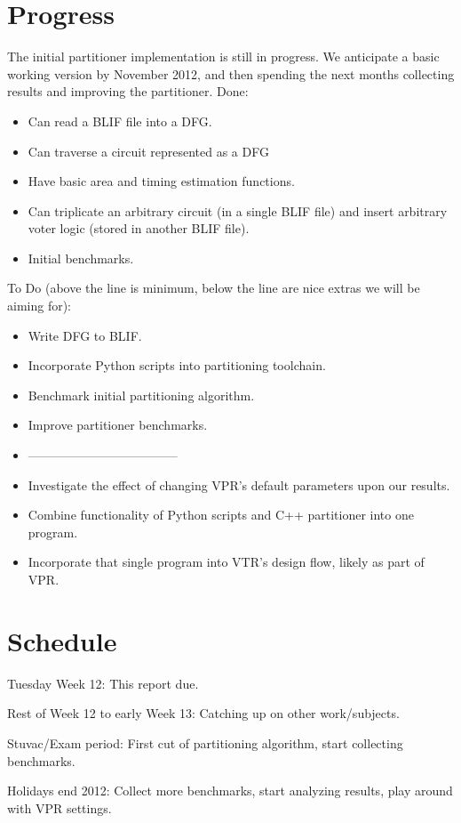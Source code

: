\documentclass[12pt,drafta4paper,oneside]{memoir} %
\begin{document}
\section{Progress}
The initial partitioner implementation is still in progress. We anticipate a basic working version by November 2012, and then spending the next months collecting results and improving the partitioner.
Done:
\begin{itemize}
    \item Can read a \ac{BLIF} file into a \ac{DFG}.
    \item Can traverse a circuit represented as a \ac{DFG}
    \item Have basic area and timing estimation functions.
    \item Can triplicate an arbitrary circuit (in a single \ac{BLIF} file) and insert arbitrary voter logic (stored in another \ac{BLIF} file).
    \item Initial benchmarks.
\end{itemize}
To Do (above the line is minimum, below the line are nice extras we will be aiming for):
\begin{itemize}
    \item Write \ac{DFG} to \ac{BLIF}.
    \item Incorporate Python scripts into partitioning toolchain.
    \item Benchmark initial partitioning algorithm.
    \item Improve partitioner benchmarks.
    \item ------------------------------------
    \item Investigate the effect of changing \ac{VPR}'s default parameters upon our results.
    \item Combine functionality of Python scripts and C++ partitioner into one program.
    \item Incorporate that single program into \ac{VTR}'s design flow, likely as part of \ac{VPR}.
\end{itemize}
\section{Schedule}
Tuesday Week 12: This report due.

Rest of Week 12 to early Week 13: Catching up on other work/subjects.

Stuvac/Exam period: First cut of partitioning algorithm, start collecting benchmarks.

Holidays end 2012: Collect more benchmarks, start analyzing results, play around with \ac{VPR} settings.
\end{document}
